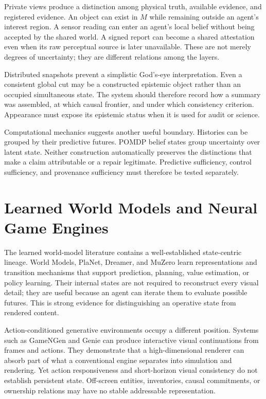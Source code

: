 \documentclass[11pt]{article}
\begin{document}
Private views produce a distinction among physical truth, available evidence, and registered evidence. An object can exist in $M$ while remaining outside an agent's interest region. A sensor reading can enter an agent's local belief without being accepted by the shared world. A signed report can become a shared attestation even when its raw perceptual source is later unavailable. These are not merely degrees of uncertainty; they are different relations among the layers.

Distributed snapshots prevent a simplistic God's-eye interpretation. Even a consistent global cut may be a constructed epistemic object rather than an occupied simultaneous state. The system should therefore record how a summary was assembled, at which causal frontier, and under which consistency criterion. Appearance must expose its epistemic status when it is used for audit or science.

Computational mechanics suggests another useful boundary. Histories can be grouped by their predictive futures. POMDP belief states group uncertainty over latent state. Neither construction automatically preserves the distinctions that make a claim attributable or a repair legitimate. Predictive sufficiency, control sufficiency, and provenance sufficiency must therefore be tested separately.

\section{Learned World Models and Neural Game Engines}

The learned world-model literature contains a well-established state-centric lineage. World Models, PlaNet, Dreamer, and MuZero learn representations and transition mechanisms that support prediction, planning, value estimation, or policy learning. Their internal states are not required to reconstruct every visual detail; they are useful because an agent can iterate them to evaluate possible futures. This is strong evidence for distinguishing an operative state from rendered content.

Action-conditioned generative environments occupy a different position. Systems such as GameNGen and Genie can produce interactive visual continuations from frames and actions. They demonstrate that a high-dimensional renderer can absorb part of what a conventional engine separates into simulation and rendering. Yet action responsiveness and short-horizon visual consistency do not establish persistent state. Off-screen entities, inventories, causal commitments, or ownership relations may have no stable addressable representation.
\end{document}
